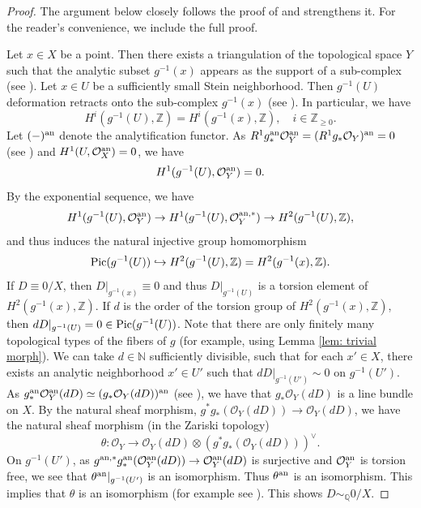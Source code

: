 \documentclass[11pt,oneside,reqno]{amsart}
\numberwithin{equation}{section}
\theoremstyle{definition}
\newcommand{\Pic}{{\rm {Pic}}}
\newcommand{\bN}{\mathbb{N}}
\newcommand{\bQ}{\mathbb{Q}}
\newcommand{\bZ}{\mathbb{Z}}
\newcommand{\mO}{\mathcal{O}}
\begin{document}
\begin{proof}
The argument below closely follows the proof of \cite[Proposition (12.1.4)]{KM92} and strengthens it. For the reader’s convenience, we include the full proof.

Let $x\in X$ be a point. Then there exists a triangulation of the topological space $Y$ such that the analytic subset $g^{-1}(x)$ appears as the support of a sub-complex (see \cite[I, Theorem (8.8)]{BHPV04}). Let $x\in U$ be a sufficiently small Stein neighborhood. Then $g^{-1}(U)$ deformation retracts onto the sub-complex $g^{-1}(x)$ (see \cite[Appendix, Proposition A.5]{Hat00}). In particular, we have
\[
H^i(g^{-1}(U), \bZ)=H^i(g^{-1}(x), \bZ), \quad i \in \bZ_{\geq 0}.
\] Let $(-)^{\rm an}$ denote the analytification functor. As $R^1g^{\rm an}_*\mO^{\rm an}_Y=(R^1g_*\mO_Y)^{\rm an}=0$ (see \cite[\textsc{Expos\'e} XII, Th\'eor\`eme 4.2]{SGA1}) and $H^1(U,\mO^{\rm an}_X)=0$, we have
\[
H^1(g^{-1}(U), \mO^{\rm an}_Y)=0.
\] By the exponential sequence, we have
\[
H^1(g^{-1}(U), \mO^{\rm an}_Y) \to H^1(g^{-1}(U),\mO_Y^{\rm an,*}) \to H^2(g^{-1}(U),\bZ),
\] and thus induces the natural injective group homomorphism
\[
{\Pic}(g^{-1}(U)) \hookrightarrow H^2(g^{-1}(U),\bZ)=H^2(g^{-1}(x),\bZ).
\] If $D \equiv 0/X$, then $D|_{g^{-1}(x)} \equiv 0$ and thus $D|_{g^{-1}(U)}$ is a torsion element of $H^2(g^{-1}(x),\bZ)$. If $d$ is the order of the torsion group of $H^2(g^{-1}(x),\bZ)$, then $dD|_{g^{-1}(U)}=0 \in \Pic(g^{-1}(U))$. Note that there are only finitely many topological types of the fibers of $g$ (for example, using Lemma \ref{lem: trivial morph}). We can take $d\in \bN$ sufficiently divisible, such that for each $x'\in X$, there exists an analytic neighborhood $x'\in U'$ such that $dD|_{g^{-1}{(U')}} \sim 0$ on $g^{-1}{(U')}$. As $g^{\rm an}_*\mO^{\rm an}_Y(dD) \simeq (g_*\mO_Y(dD))^{\rm an}$ (see \cite[\textsc{Expos\'e} XII, Th\'eor\`eme 4.2]{SGA1}), we have that $g_*\mO_Y(dD)$ is a line bundle on $X$. By the natural sheaf morphism, $g^*g_*(\mO_Y(dD)) \to \mO_Y(dD)$, we have the natural sheaf morphism (in the Zariski topology)
\[
\theta: \mO_Y \to \mO_Y(dD) \otimes (g^*g_*(\mO_Y(dD)))^{\vee}.
\] On $g^{-1}(U')$, as $g^{\rm an,*}g^{\rm an}_*(\mO^{\rm an}_Y(dD)) \to \mO^{\rm an}_Y(dD)$ is surjective and $\mO^{\rm an}_Y$ is torsion free, we see that $\theta^{\rm an}|_{g^{-1}(U')}$ is an isomorphism. Thus $\theta^{\rm an}$ is an isomorphism. This implies that $\theta$ is an isomorphism (for example see \cite[\textsc{Expos\'e} XII, Th\'eor\`eme et d\'efinition 1.1]{SGA1}). This shows $D \sim_{\bQ} 0/X$.


\end{proof}
\end{document}

